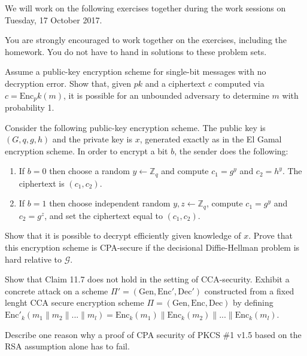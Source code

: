 \documentclass[a4paper,10pt,landscape,twocolumn]{scrartcl}
\newcommand\worksession{Tuesday, 17 October 2017}
\begin{document}
\problems

{\sffamily\noindent
We will work on the following exercises together during the work sessions on \worksession.

You are strongly encouraged to work together on the exercises, including the homework. You do not have to hand in solutions to these problem sets.}

\begin{exercise}
	Assume a public-key encryption scheme for single-bit messages with no
	decryption error. Show that, given $pk$ and a ciphertext $c$ computed via
	$c=\mathrm{Enc}_pk(m)$, it is possible for an unbounded adversary to determine
	$m$ with probability 1.
\end{exercise}

\begin{exercise}
	Consider the following public-key encryption scheme. The public key is $(G,q,g,h)$ and the private key is $x$, generated exactly as in the El Gamal encryption scheme. In order to encrypt a bit $b$, the sender does the following:
	\begin{enumerate}
		\item If $b=0$ then choose a random $y\leftarrow \mathbb{Z}_q$ and compute $c_1 =g^y$ and $c_2 = h^y$. The ciphertext is $(c_1, c_2)$.
		\item If $b = 1$ then choose independent random $y,z \leftarrow \mathbb{Z}_q$, compute $c_1 = g^y$ and $c_2 = g^z$, and set the ciphertext equal to $(c_1, c_2)$.
	\end{enumerate}
	Show that it is possible to decrypt efficiently given knowledge of $x$. Prove that this encryption scheme is CPA-secure if the decisional Diffie-Hellman problem is hard relative to $\mathcal{G}$.
\end{exercise}
	
\begin{exercise}[Exercise 11.5 in {[KL]}.]
	Show that Claim 11.7 does not hold in the setting of CCA-security. Exhibit a concrete attack on a scheme $\Pi'=(\mathrm{Gen},\mathrm{Enc}', \mathrm{Dec}')$ constructed from a fixed lenght CCA secure encryption scheme $\Pi=(\mathrm{Gen},\mathrm{Enc}, \mathrm{Dec})$ by defining $\mathrm{Enc}'_k(m_1\|m_2\|...\|m_l)=\mathrm{Enc}_k(m_1)\|\mathrm{Enc}_k(m_2)\|...\|\mathrm{Enc}_k(m_l)$.
\end{exercise}

\begin{exercise}[PKCS \#1 v1.5]
	Describe one reason why a proof of CPA security of PKCS \#1 v1.5 based on the RSA assumption alone has to fail.
\end{exercise}
\end{document}
